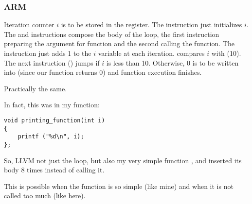 \subsubsection{ARM}

\myparagraph{\NonOptimizingKeilVI (\ARMMode)}



Iteration counter $i$ is to be stored in the  register.
The  instruction just initializes $i$.
The  and  instructions
compose the body of the loop, the first instruction preparing the argument for 
\ttf function and the second calling the function.
The  instruction just adds 1 to the $i$ variable at each iteration.
 compares $i$ with  (10). 
The next instruction  () jumps if $i$ is less than 10.
Otherwise, 0 is to be written into  (since our function returns 0)
and function execution finishes.

\myparagraph{\OptimizingKeilVI (\ThumbMode)}



Practically the same.

\myparagraph{\OptimizingXcodeIV (\ThumbTwoMode)}
\label{ARM_unrolled_loops}



In fact, this was in my \ttf function:

\begin{lstlisting}
void printing_function(int i)
{
    printf ("%d\n", i);
};
\end{lstlisting}

So, LLVM not just  the loop, 
but also  my 
very simple function \ttf,
and inserted its body 8 times instead of calling it. 

This is possible when the function is so simple (like mine) and when it is not called too much (like here).






